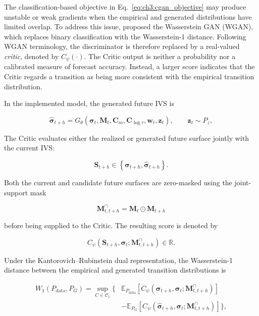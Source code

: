 The classification-based objective in
Eq.~\eqref{eq:ch3:cgan_objective} may produce unstable or weak gradients when
the empirical and generated distributions have limited overlap. To address
this issue, \citet{arjovsky2017wasserstein} proposed the Wasserstein GAN
(WGAN), which replaces binary classification with the Wasserstein-1 distance.
Following WGAN terminology, the discriminator is therefore replaced by a
real-valued \textit{critic}, denoted by $C_{\psi}(\cdot)$. The Critic output
is neither a probability nor a calibrated measure of forecast accuracy.
Instead, a larger score indicates that the Critic regards a transition as
being more consistent with the empirical transition distribution.

In the implemented model, the generated future IVS is

\begin{equation}\label{eq:ch3:wgan_generated_surface}
\widehat{\boldsymbol{\sigma}}_{t+h}
=
G_{\theta}
\left(
\boldsymbol{\sigma}_t,
\mathbf{M}_t,
\mathbf{C}_m,
\mathbf{C}_{\log \tau},
\mathbf{w}_t,
\mathbf{z}_t
\right),
\qquad
\mathbf{z}_t\sim P_z,
\end{equation}

The Critic evaluates either the realized or generated future surface jointly with the current IVS:

\begin{equation}
\mathbf{S}_{t+h}
\in
\left\{
\boldsymbol{\sigma}_{t+h},
\widehat{\boldsymbol{\sigma}}_{t+h}
\right\}.
\end{equation}

Both the current and candidate future surfaces are zero-masked using the
joint-support mask

\begin{equation}
\mathbf{M}^{\cap}_{t,t+h}
=
\mathbf{M}_t
\odot
\mathbf{M}_{t+h}
\end{equation}

before being supplied to the Critic. The resulting score is denoted by

\begin{equation}
C_{\psi}
\left(
\mathbf{S}_{t+h},
\boldsymbol{\sigma}_t;
\mathbf{M}^{\cap}_{t,t+h}
\right)
\in
\mathbb{R}.
\end{equation}

Under the Kantorovich--Rubinstein dual representation, the Wasserstein-1
distance between the empirical and generated transition distributions is

\begin{align}
W_1
\left(
P_{\mathrm{data}},
P_G
\right)
=
\sup_{C\in\mathcal{C}_1}
\Bigg\{&
\mathbb{E}_{P_{\mathrm{data}}}
\left[
C_{\psi}
\left(
\boldsymbol{\sigma}_{t+h},
\boldsymbol{\sigma}_t;
\mathbf{M}^{\cap}_{t,t+h}
\right)
\right]
\nonumber\\
&-
\mathbb{E}_{P_G}
\left[
C_{\psi}
\left(
\widehat{\boldsymbol{\sigma}}_{t+h},
\boldsymbol{\sigma}_t;
\mathbf{M}^{\cap}_{t,t+h}
\right)
\right]
\Bigg\},
\label{eq:ch3:wasserstein_distance}
\end{align}

